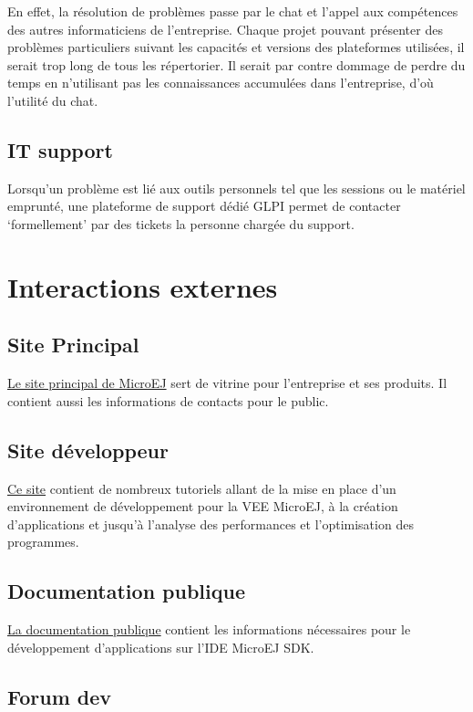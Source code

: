 \documentclass[french,a4paper,12pt]{report}
\begin{document}
En effet, la résolution de problèmes passe par le chat et l'appel aux compétences des autres informaticiens de l’entreprise. Chaque projet pouvant présenter des problèmes particuliers suivant les capacités et versions des plateformes utilisées, il serait trop long de tous les répertorier. Il serait par contre dommage de perdre du temps en n’utilisant pas les connaissances accumulées dans l’entreprise, d'où l'utilité du chat. 

\subsection{IT support}

Lorsqu’un problème est lié aux outils personnels tel que les sessions ou le matériel emprunté, une plateforme de support dédié GLPI permet de contacter ‘formellement’ par des tickets la personne chargée du support.

\section{Interactions externes}
\subsection{Site Principal}

\href{https://www.microej.com/}{Le site principal de MicroEJ} sert de vitrine pour l'entreprise et ses produits. Il contient aussi les informations de contacts pour le public.

\subsection{Site développeur}

\href{https://developer.microej.com/}{Ce site} contient de nombreux tutoriels allant de la mise en place d'un environnement de développement pour la VEE MicroEJ, à la création d'applications et jusqu'à l'analyse des performances et l'optimisation des programmes.

\subsection{Documentation publique}

\href{https://docs.microej.com/en/latest/}{La documentation publique} contient les informations nécessaires pour le développement d’applications sur l’IDE MicroEJ SDK.

\subsection{Forum dev}
\end{document}
